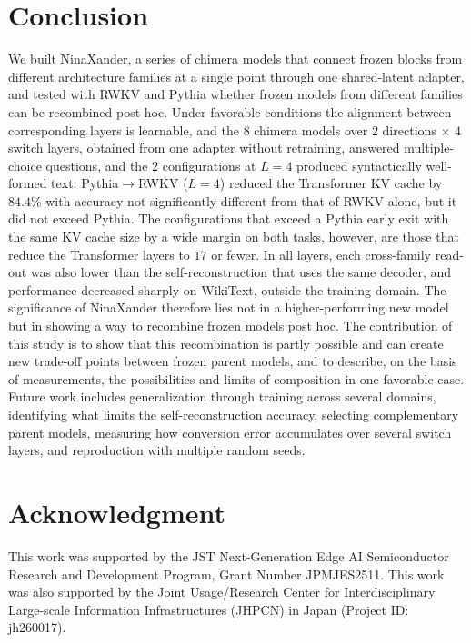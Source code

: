 \documentclass[conference]{IEEEtran}
\newcommand{\PtoR}{Pythia$\to$\allowbreak RWKV}
\newcommand{\PtoRL}[1]{\PtoR{} ($L{=}#1$)}
\begin{document}
\section{Conclusion}\label{sec:conclusion}
We built NinaXander, a series of chimera models that connect frozen blocks from different architecture families at a single point
through one shared-latent adapter, and tested with RWKV and Pythia whether frozen models from different families
can be recombined post hoc. Under favorable conditions the alignment between corresponding layers is learnable, and the $8$
chimera models over $2$ directions $\times$ $4$ switch layers, obtained from one adapter without retraining, answered multiple-choice
questions, and the $2$ configurations at $L{=}4$ produced syntactically well-formed text. \PtoRL{4} reduced the Transformer KV cache by $84.4\%$ with accuracy not significantly different from that of RWKV alone,
but it did not exceed Pythia. The configurations that exceed a Pythia early exit with the same KV cache size by a wide margin on both
tasks, however, are those that reduce the Transformer layers to $17$ or fewer. In all layers, each cross-family read-out was also lower than the
self-reconstruction that uses the same decoder, and performance decreased sharply on WikiText, outside the training domain. The significance of NinaXander therefore lies not in a
higher-performing new model but in showing a way to recombine frozen models post hoc. The contribution of this study is to show that this
recombination is partly possible
and can create new trade-off points between frozen parent models, and to describe, on the basis of measurements, the possibilities and
limits of composition in one favorable case. Future work includes generalization through training across several
domains, identifying what limits the self-reconstruction accuracy, selecting complementary parent models, measuring how conversion
error accumulates over several switch layers, and reproduction with multiple
random seeds.

\section*{Acknowledgment}
This work was supported by the JST Next-Generation Edge AI Semiconductor Research and Development Program, Grant Number JPMJES2511.
This work was also supported by the Joint Usage/Research Center for Interdisciplinary Large-scale Information Infrastructures (JHPCN) in Japan (Project ID: jh260017).




\end{document}
